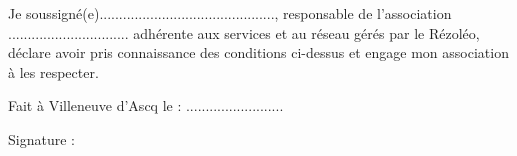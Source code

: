 \documentclass[11pt]{article}
\begin{document}
\vspace*{0.5cm}

Je soussigné(e)............................................., responsable de l'association ............................... adhérente aux services et au réseau gérés par le Rézoléo,
déclare avoir pris connaissance des conditions ci-dessus et engage mon association à les respecter.

\vspace*{0.5cm}

\hspace{7.5cm} Fait à Villeneuve d'Ascq le : ......................... 


\hspace{7.5cm} Signature :
\end{document}
